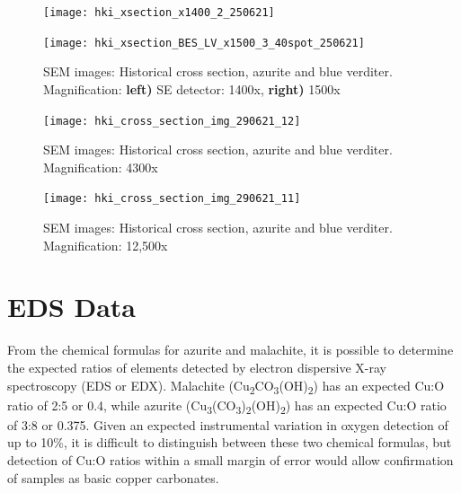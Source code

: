 \begin{figure}[H]
\centering
\begin{minipage}{.45\textwidth}
  \centering
  \texttt{[image: hki\_xsection\_x1400\_2\_250621]}
\end{minipage}
\begin{minipage}{.45\textwidth}
  \centering
  \texttt{[image: hki\_xsection\_BES\_LV\_x1500\_3\_40spot\_250621]}
\end{minipage}
\caption[SEM images: Historical cross section, azurite and blue verditer]{SEM images: Historical cross section, azurite and blue verditer. Magnification: \textbf{left)} SE detector: 1400x, \textbf{right)} 1500x}
\label{fig:xsection_jeol_2}
\end{figure}

\begin{figure}[H]
\centering
  \texttt{[image: hki\_cross\_section\_img\_290621\_12]}
\caption[SEM images: Historical cross section, azurite and blue verditer]{SEM images: Historical cross section, azurite and blue verditer. Magnification: 4300x}
\label{fig:xsection_dept_1}
\end{figure}

\begin{figure}[H]
\centering
  \texttt{[image: hki\_cross\_section\_img\_290621\_11]}
\caption[SEM images: Historical cross section, azurite and blue verditer]{SEM images: Historical cross section, azurite and blue verditer. Magnification: 12,500x}
\label{fig:xsection_dept_2}
\end{figure}


\section[EDS Data]{EDS Data}
\label{section3.2}

From the chemical formulas for azurite and malachite, it is possible to determine the expected ratios of elements detected by electron dispersive X-ray spectroscopy (EDS or EDX). Malachite (Cu\textsubscript{2}CO\textsubscript{3}(OH)\textsubscript{2}) has an expected Cu:O ratio of 2:5 or 0.4, while azurite (Cu\textsubscript{3}(CO\textsubscript{3})\textsubscript{2}(OH)\textsubscript{2}) has an expected Cu:O ratio of 3:8 or 0.375. Given an expected instrumental variation in oxygen detection of up to 10\%, it is difficult to distinguish between these two chemical formulas, but detection of Cu:O ratios within a small margin of error would allow confirmation of samples as basic copper carbonates.

